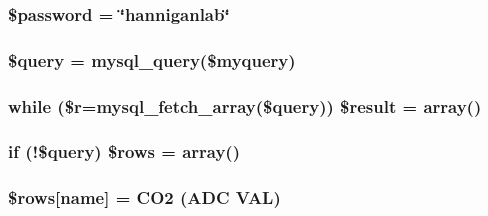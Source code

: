 \subsubsection[{\texorpdfstring{\$password}{$password}}]{\setlength{\rightskip}{0pt plus 5cm}\$password = \char`\"{}hanniganlab\char`\"{}}\hypertarget{_c_o2___j_s_o_n_8php_a607686ef9f99ea7c42f4f3dd3dbb2b0d}{}\label{_c_o2___j_s_o_n_8php_a607686ef9f99ea7c42f4f3dd3dbb2b0d}
\subsubsection[{\texorpdfstring{\$query}{$query}}]{\setlength{\rightskip}{0pt plus 5cm}\$query = mysql\+\_\+query(\$myquery)}\hypertarget{_c_o2___j_s_o_n_8php_af59a5f7cd609e592c41dc3643efd3c98}{}\label{_c_o2___j_s_o_n_8php_af59a5f7cd609e592c41dc3643efd3c98}
\subsubsection[{\texorpdfstring{\$result}{$result}}]{\setlength{\rightskip}{0pt plus 5cm}while (\$r=mysql\+\_\+fetch\+\_\+array(\$query)) \$result = array()}\hypertarget{_c_o2___j_s_o_n_8php_a9148136d1e11f768be4f805d7e567da2}{}\label{_c_o2___j_s_o_n_8php_a9148136d1e11f768be4f805d7e567da2}
\subsubsection[{\texorpdfstring{\$rows}{$rows}}]{\setlength{\rightskip}{0pt plus 5cm}if (!\$query) \$rows = array()}\hypertarget{_c_o2___j_s_o_n_8php_a9d560e904e6665a6ee21f86a65c1ef8e}{}\label{_c_o2___j_s_o_n_8php_a9d560e904e6665a6ee21f86a65c1ef8e}
\subsubsection[{\texorpdfstring{\$rows}{$rows}}]{\setlength{\rightskip}{0pt plus 5cm}\$rows\mbox{[}\textquotesingle{}name\textquotesingle{}\mbox{]} = \textquotesingle{}C\+O2 (A\+DC V\+AL)\textquotesingle{}}\hypertarget{_c_o2___j_s_o_n_8php_a6384d385f2f9c3f6bcad27ed87e67106}{}\label{_c_o2___j_s_o_n_8php_a6384d385f2f9c3f6bcad27ed87e67106}
